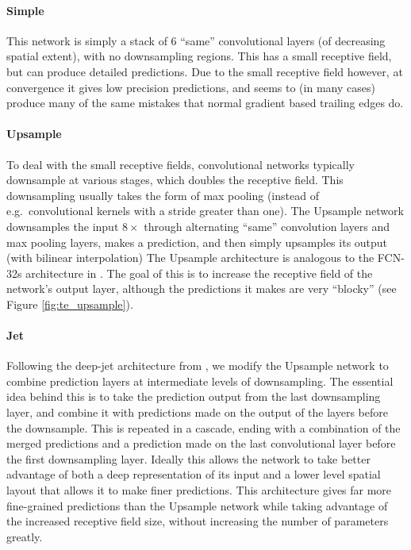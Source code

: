 \paragraph{Simple}
This network is simply a stack of $6$ ``same'' convolutional layers (of decreasing spatial extent), with no downsampling regions.
This has a small receptive field, but can produce detailed predictions.
Due to the small receptive field however, at convergence it gives low precision predictions, and seems to (in many cases) produce many of the same mistakes that normal gradient based trailing edges do.

\paragraph{Upsample}
To deal with the small receptive fields, convolutional networks typically downsample at various stages, which doubles the receptive field. 
This downsampling usually takes the form of max pooling (instead of e.g.\ convolutional kernels with a stride greater than one).
The Upsample network downsamples the input $8\times$ through alternating ``same'' convolution layers and max pooling layers, makes a prediction, and then simply upsamples its output (with bilinear interpolation)
The Upsample architecture is analogous to the FCN-32s architecture in \cite{long2015fully}.%
The goal of this is to increase the receptive field of the network's output layer, although the predictions it makes are very ``blocky'' (see Figure \ref{fig:te_upsample}).

\paragraph{Jet}
Following the deep-jet architecture from \cite{long2015fully}, we modify the Upsample network to combine prediction layers at intermediate levels of downsampling.
The essential idea behind this is to take the prediction output from the last downsampling layer, and combine it with predictions made on the output of the layers before the downsample.
This is repeated in a cascade, ending with a combination of the merged predictions and a prediction made on the last convolutional layer before the first downsampling layer.
Ideally this allows the network to take better advantage of both a deep representation of its input and a lower level spatial layout that allows it to make finer predictions.
This architecture gives far more fine-grained predictions than the Upsample network while taking advantage of the increased receptive field size, without increasing the number of parameters greatly.

